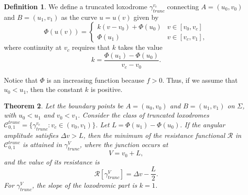 \documentclass[a4paper,12pt]{amsart}
\newtheorem{theorem}{Theorem}[section]
\theoremstyle{definition}
\newtheorem{definition}[theorem]{Definition}
\def\R{\mathcal{ R}}
\begin{document}
 \begin{definition}
We define a truncated loxodrome $\gamma_{trunc}^{v_c}$   connecting $A=(u_0, v_0)$ and $B=(u_1, v_1)$ as the curve $u=u(v)$ given by
\begin{equation*}
\Phi(u(v)) = \begin{cases} 
 k(v - v_0) +\Phi(u_0) & v \in [v_0, v_c] \\
\Phi(u_1) & v \in [v_c, v_1],
\end{cases}
\end{equation*}
 where   continuity at $v_c$ requires that $k$ takes the value 
 \begin{equation}\label{k1}
 k = \frac{\Phi(u_1) - \Phi(u_0)}{v_c - v_0}.
 \end{equation}
\end{definition}
Notice that $\Phi$ is an increasing function because $f>0$. Thus, if we assume that $u_0<u_1$, then the constant $k$ is positive.  


\begin{theorem}\label{t51}
Let the boundary points be $A = (u_0, v_0)$ and $B = (u_1, v_1)$ on $\Sigma$, with $u_0 < u_1$ and $v_0 < v_1$. Consider the class of truncated loxodromes $\mathcal{C}_{0,1}^{trunc} = \{\gamma_{trunc}^{v_c} : v_c \in (v_0, v_1)\}$. Let $L = \Phi(u_1) - \Phi(u_0)$. If the angular amplitude satisfies $\Delta v > L$, then the minimum of the resistance functional $\R$ in $\mathcal{C}_{0,1}^{trunc}$ is attained in $\gamma_{trunc}^V$, where  the junction occurs at
\begin{equation}
V = v_0 + L,
\end{equation}
and the value of its resistance is 
\begin{equation}\label{rv}
\R[\gamma_{trunc}^{V}]=\Delta v-\frac{L}{2}.
\end{equation}
For $\gamma_{trunc}^V$, the slope of the loxodromic part is $k = 1$.
\end{theorem}
\end{document}
